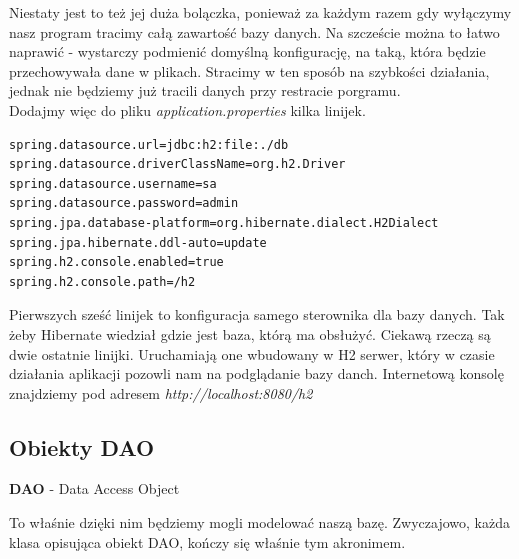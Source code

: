 \documentclass{article}
\begin{document}
            Niestaty jest to też jej duża bolączka, ponieważ za każdym razem gdy wyłączymy nasz program tracimy całą zawartość bazy danych. Na szczeście można to łatwo naprawić - wystarczy podmienić domyślną konfigurację, na taką, która będzie przechowywała dane w plikach. Stracimy w ten sposób na szybkości działania, jednak nie będziemy już tracili danych przy restracie porgramu. \\
            Dodajmy więc do pliku \emph{application.properties} kilka linijek.
            \begin{verbatim}
spring.datasource.url=jdbc:h2:file:./db
spring.datasource.driverClassName=org.h2.Driver
spring.datasource.username=sa
spring.datasource.password=admin
spring.jpa.database-platform=org.hibernate.dialect.H2Dialect
spring.jpa.hibernate.ddl-auto=update
spring.h2.console.enabled=true
spring.h2.console.path=/h2
            \end{verbatim}
            Pierwszych sześć linijek to konfiguracja samego sterownika dla bazy danych. Tak żeby Hibernate wiedział gdzie jest baza, którą ma obsłużyć. Ciekawą rzeczą są dwie ostatnie linijki. Uruchamiają one wbudowany w H2 serwer, który w czasie działania aplikacji pozowli nam na podglądanie bazy danch. Internetową konsolę znajdziemy pod adresem \emph{http://localhost:8080/h2}
        
        \subsection{Obiekty DAO}
            \textbf{DAO} - Data Access Object 
            
            To właśnie dzięki nim będziemy mogli modelować naszą bazę. Zwyczajowo, każda klasa opisująca obiekt DAO, kończy się właśnie tym akronimem. 
\end{document}
